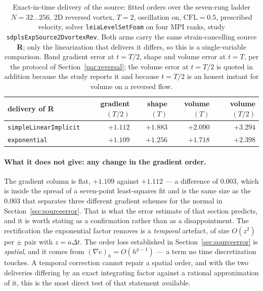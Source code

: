 \documentclass[preprint,3p,11pt]{elsarticle}
\begin{document}
\begin{table}[htbp]
\centering
\caption{Exact-in-time delivery of the source: fitted orders over the seven-rung
ladder $N = 32\ldots256$, 2D reversed vortex, $T=2$, oscillation on,
$\mathrm{CFL}=0.5$, prescribed velocity, solver \texttt{leiaLevelSetFoam} on four
MPI ranks, study \texttt{sdplsExpSource2DvortexRev}. Both arms carry the same
strain-cancelling source \textbf{R}; only the linearization that delivers it
differs, so this is a single-variable comparison. Band gradient error at $t=T/2$,
shape and volume error at $t=T$, per the protocol of Section~\ref{par:reversal};
the volume error at $t=T/2$ is quoted in addition because the study reports it and
because $t=T/2$ is an honest instant for volume on a reversed flow.}
\label{tab:expsource}
\small
\begin{tabular}{lrrrr}
\toprule
delivery of \textbf{R} & gradient $(T/2)$ & shape $(T)$ & volume $(T)$ & volume $(T/2)$ \\
\midrule
\texttt{simpleLinearImplicit} & $+1.112$ & $+1.883$ & $+2.090$ & $+3.294$ \\
\texttt{exponential}          & $+1.109$ & $+1.256$ & $+1.718$ & $+2.398$ \\
\bottomrule
\end{tabular}
\end{table}

\paragraph{What it does not give: any change in the gradient order.} The gradient
column is flat, $+1.109$ against $+1.112$ --- a difference of $0.003$, which is
inside the spread of a seven-point least-squares fit and is the same size as the
$0.003$ that separates three different gradient schemes for the normal in
Section~\ref{sec:sourceerror}. That is what the error estimate of that section
predicts, and it is worth stating as a confirmation rather than as a
disappointment. The rectification the exponential factor removes is a
\emph{temporal} artefact, of size $O(z^2)$ per $\pm$ pair with $z = a\Delta t$.
The order loss established in Section~\ref{sec:sourceerror} is \emph{spatial}, and
it comes from $(\nabla e)_h = O(h^{p-1})$ --- a term no time discretization
touches. A temporal correction cannot repair a spatial order, and with the two
deliveries differing by an exact integrating factor against a rational
approximation of it, this is the most direct test of that statement available.
\end{document}
